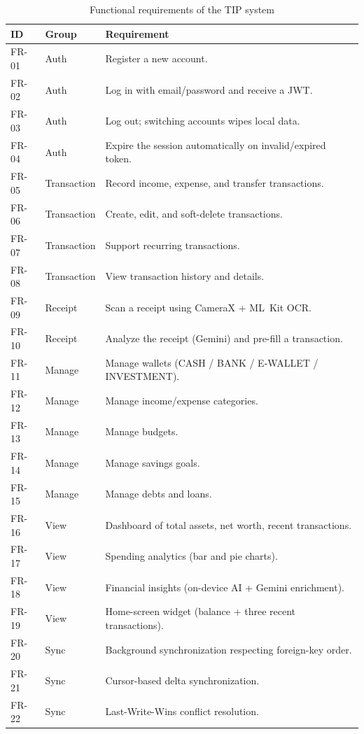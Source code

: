\documentclass[13pt,a4paper]{extarticle}
\begin{document}
\begin{table}[H]
\centering
\caption{Functional requirements of the TIP system}
\label{tab:fr}
\renewcommand{\arraystretch}{1.15}
\begin{tabularx}{\textwidth}{@{}l l X@{}}
\toprule
\textbf{ID} & \textbf{Group} & \textbf{Requirement} \\
\midrule
FR-01 & Auth        & Register a new account. \\
FR-02 & Auth        & Log in with email/password and receive a JWT. \\
FR-03 & Auth        & Log out; switching accounts wipes local data. \\
FR-04 & Auth        & Expire the session automatically on invalid/expired token. \\
FR-05 & Transaction & Record income, expense, and transfer transactions. \\
FR-06 & Transaction & Create, edit, and soft-delete transactions. \\
FR-07 & Transaction & Support recurring transactions. \\
FR-08 & Transaction & View transaction history and details. \\
FR-09 & Receipt     & Scan a receipt using CameraX + ML~Kit OCR. \\
FR-10 & Receipt     & Analyze the receipt (Gemini) and pre-fill a transaction. \\
FR-11 & Manage      & Manage wallets (CASH / BANK / E-WALLET / INVESTMENT). \\
FR-12 & Manage      & Manage income/expense categories. \\
FR-13 & Manage      & Manage budgets. \\
FR-14 & Manage      & Manage savings goals. \\
FR-15 & Manage      & Manage debts and loans. \\
FR-16 & View        & Dashboard of total assets, net worth, recent transactions. \\
FR-17 & View        & Spending analytics (bar and pie charts). \\
FR-18 & View        & Financial insights (on-device AI + Gemini enrichment). \\
FR-19 & View        & Home-screen widget (balance + three recent transactions). \\
FR-20 & Sync        & Background synchronization respecting foreign-key order. \\
FR-21 & Sync        & Cursor-based delta synchronization. \\
FR-22 & Sync        & Last-Write-Wins conflict resolution. \\
\bottomrule
\end{tabularx}
\end{table}
\end{document}
